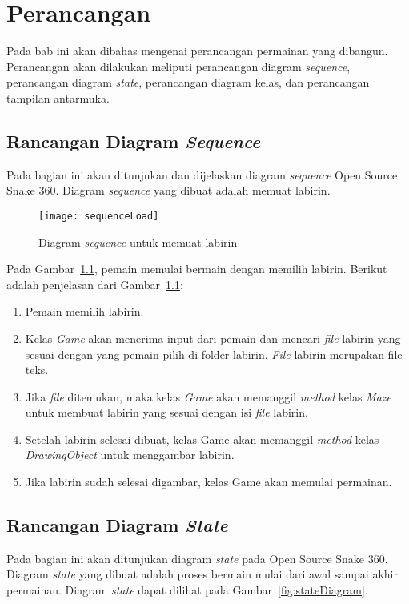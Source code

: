 \chapter{Perancangan}
\label{chap:perancangan}

Pada bab ini akan dibahas mengenai perancangan permainan yang dibangun. Perancangan akan dilakukan meliputi perancangan diagram \textit{sequence}, perancangan diagram \textit{state}, perancangan diagram kelas, dan perancangan tampilan antarmuka.

\section{Rancangan Diagram \textit{Sequence}}
Pada bagian ini akan ditunjukan dan dijelaskan diagram \textit{sequence} Open Source Snake 360. Diagram \textit{sequence} yang dibuat adalah memuat labirin. 

\begin{figure}[H]
	\centering  
	\texttt{[image: sequenceLoad]}  
	\caption[Diagram \textit{sequence} untuk memuat labirin]{Diagram \textit{sequence} untuk memuat labirin}
	\label{fig:sequenceLoad} 
\end{figure}

Pada Gambar~\ref{fig:sequenceLoad}, pemain memulai bermain dengan memilih labirin. Berikut adalah penjelasan dari Gambar~\ref{fig:sequenceLoad}:

\begin{enumerate}
	\item Pemain memilih labirin. 
	\item Kelas \textit{Game} akan menerima input dari pemain dan mencari \textit{file} labirin yang sesuai dengan yang pemain pilih di folder labirin. \textit{File} labirin merupakan file teks.
	\item Jika \textit{file} ditemukan, maka kelas \textit{Game} akan memanggil \textit{method} kelas \textit{Maze} untuk membuat labirin yang sesuai dengan isi \textit{file} labirin. 
	\item Setelah labirin selesai dibuat, kelas Game akan memanggil \textit{method} kelas \textit{DrawingObject} untuk menggambar labirin.
	\item Jika labirin sudah selesai digambar, kelas Game akan memulai permainan.
\end{enumerate}

\section{Rancangan Diagram \textit{State}}
Pada bagian ini akan ditunjukan diagram \textit{state} pada Open Source Snake 360. Diagram \textit{state} yang dibuat adalah proses bermain mulai dari awal sampai akhir permainan. Diagram \textit{state} dapat dilihat pada Gambar~\ref{fig:stateDiagram}.

